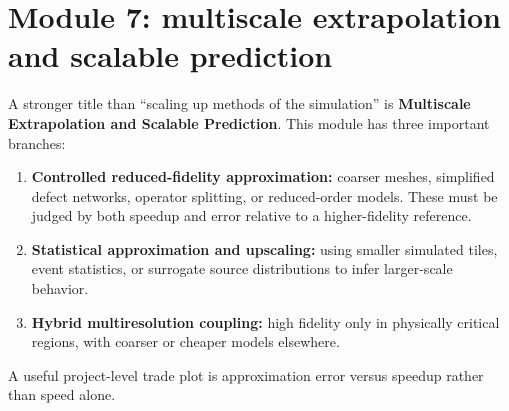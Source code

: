\documentclass[11pt]{article}
\begin{document}
\section{Module 7: multiscale extrapolation and scalable prediction}
A stronger title than ``scaling up methods of the simulation'' is \textbf{Multiscale Extrapolation and Scalable Prediction}. This module has three important branches:
\begin{enumerate}[leftmargin=1.6em]
    \item \textbf{Controlled reduced-fidelity approximation:} coarser meshes, simplified defect networks, operator splitting, or reduced-order models. These must be judged by both speedup and error relative to a higher-fidelity reference.
    \item \textbf{Statistical approximation and upscaling:} using smaller simulated tiles, event statistics, or surrogate source distributions to infer larger-scale behavior.
    \item \textbf{Hybrid multiresolution coupling:} high fidelity only in physically critical regions, with coarser or cheaper models elsewhere.
\end{enumerate}
A useful project-level trade plot is approximation error versus speedup rather than speed alone.
\end{document}
